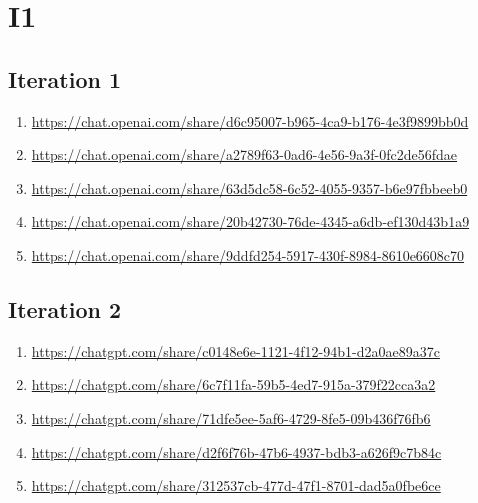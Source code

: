 \section{I1\label{I1-1}}

\subsection{Iteration 1}

\begin{enumerate}
    \item \href{https://chat.openai.com/share/d6c95007-b965-4ca9-b176-4e3f9899bb0d}{https://chat.openai.com/share/d6c95007-b965-4ca9-b176-4e3f9899bb0d}
    \item \href{https://chat.openai.com/share/a2789f63-0ad6-4e56-9a3f-0fc2de56fdae}{https://chat.openai.com/share/a2789f63-0ad6-4e56-9a3f-0fc2de56fdae}
    \item \href{https://chat.openai.com/share/63d5dc58-6c52-4055-9357-b6e97fbbeeb0}{https://chat.openai.com/share/63d5dc58-6c52-4055-9357-b6e97fbbeeb0}
    \item \href{https://chat.openai.com/share/20b42730-76de-4345-a6db-ef130d43b1a9}{https://chat.openai.com/share/20b42730-76de-4345-a6db-ef130d43b1a9}
    \item \href{https://chat.openai.com/share/9ddfd254-5917-430f-8984-8610e6608c70}{https://chat.openai.com/share/9ddfd254-5917-430f-8984-8610e6608c70}
\end{enumerate}

\subsection{Iteration 2}

\begin{enumerate}
    \item \href{https://chatgpt.com/share/c0148e6e-1121-4f12-94b1-d2a0ae89a37c}{https://chatgpt.com/share/c0148e6e-1121-4f12-94b1-d2a0ae89a37c}
    \item \href{https://chatgpt.com/share/6c7f11fa-59b5-4ed7-915a-379f22cca3a2}{https://chatgpt.com/share/6c7f11fa-59b5-4ed7-915a-379f22cca3a2}
    \item \href{https://chatgpt.com/share/71dfe5ee-5af6-4729-8fe5-09b436f76fb6}{https://chatgpt.com/share/71dfe5ee-5af6-4729-8fe5-09b436f76fb6}
    \item \href{https://chatgpt.com/share/d2f6f76b-47b6-4937-bdb3-a626f9c7b84c}{https://chatgpt.com/share/d2f6f76b-47b6-4937-bdb3-a626f9c7b84c}
    \item \href{https://chatgpt.com/share/312537cb-477d-47f1-8701-dad5a0fbe6ce}{https://chatgpt.com/share/312537cb-477d-47f1-8701-dad5a0fbe6ce}
\end{enumerate}